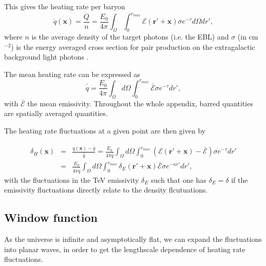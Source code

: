 \documentclass[twocolumns]{emulateapj}
\begin{document}
This gives the  heating rate per baryon
\begin{equation}
  \label{eq:heating_rate0}
  \dot{q}(\mathbf{x})=\frac{\dot{Q}}{n}= \frac{E_0}{4\pi}  \int_{\Omega}\int_0^{r_{max}}   \mathcal{E}(\mathbf{r}'+\mathbf{x})\sigma  e^{-\tau}d\Omega dr' ,
\end{equation}
where $n$ is the average density of the target photons (i.e. the EBL) and $\sigma$ (in cm$^{-2}$) is the energy averaged cross section for pair production on the extragalactic background light photons \citep{1967PhRv..155.1408G}. 


The mean heating rate can be expressed as
\begin{equation}
  \label{eq:heating_rate0}
  \bar{\dot{q}}=\frac{E_0}{4\pi} \int_{\Omega}d\Omega\int_0^{r_{max}}  \bar{\mathcal{E}}\sigma  e^{-\tau}dr', 
\end{equation}
with $\bar{\mathcal{E}}$ the mean emissivity. Throughout the whole appendix, barred quantities are spatially averaged quantities.

The heating rate fluctuations at a given point are then given by 

\begin{eqnarray}
  \label{eq:heat_fluc_newt0}
  \delta_H(\mathbf{x})&=&\frac{\dot{q}(\mathbf{x})-\bar{\dot{q}}}{\bar{\dot{q}}}=\frac{E_0}{4\pi\bar{\dot{q}}} \int_{\Omega}d\Omega\int_0^{r_{max}}   (\mathcal{E}(\mathbf{r}'+\mathbf{x})-\bar{\mathcal{E}}) \sigma  e^{-\tau} dr' \\ \nonumber
  &=&\frac{E_0}{4\pi\bar{\dot{q}}}\int_{\Omega}d\Omega\int_0^{r_{max}}   \delta_E(\mathbf{r}'+\mathbf{x})\bar{\mathcal{E}}\sigma  e^{-\kappa r'}dr',
\end{eqnarray}
with the fluctuations in the TeV emissivity $\delta_E$ such that one has $\delta_E=\delta$ if the emissivity fluctuations directly relate to the density flcutuations.

\subsection{Window function}
As the universe is infinite and asymptotically flat, we can expand the fluctuations into planar waves, in order to get the lengthscale dependence of heating rate fluctuations.
\end{document}

